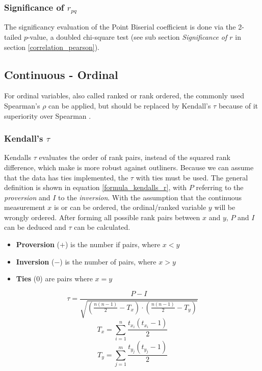 \documentclass[a4paper,headsepline,footsepline,fontsize=11pt,BCOR=12mm,DIV=12]{report}
\begin{document}
\subsubsection{Significance of $r_{pq}$}
The significancy evaluation of the Point Biserial coefficient is done via the 2-tailed $p$-value, a doubled chi-square test (see sub section \textit{Significance of $r$} in section \ref{correlation_pearson}).

\subsection{Continuous - Ordinal}
For ordinal variables, also called ranked or rank ordered, the commonly used Spearman's $\rho$ can be applied, but should be replaced by Kendall's $\tau$ because of it superiority over Spearman \cite{Newson2002}. 

\subsubsection{Kendall's $\tau$}
Kendalls $\tau$ evaluates the order of rank pairs, instead of the squared rank difference, which make is more robust against outliners. Because we can assume that the data has ties implemented, the $\tau$ with ties must be used. The general definition is shown in equation \ref{formula_kendalls_r}, with $P$ referring to the \textit{proversion} and $I$ to the \textit{inversion}. With the assumption that the continuous measurement $x$ is or can be ordered, the ordinal/ranked variable $y$ will be wrongly ordered. After forming all possible rank pairs between $x$ and $y$, $P$ and $I$ can be deduced and $\tau$ can be calculated. \cite{Reiter2015,Bossart2017}

\begin{itemize}	
	\item[] \textbf{Proversion} ($+$) is the number if pairs, where $x < y$ 
	\item[] \textbf{Inversion} ($-$) is the number of pairs, where $x > y$ 
	\item[] \textbf{Ties} ($0$) are pairs where $x = y$
\end{itemize}

\begin{equation}
\label{formula_kendalls_r}
	\tau = \frac{P-I}{\sqrt{(\frac{n(n-1)}{2}-T_x) \cdot (\frac{n(n-1)}{2}-T_y)}}
\end{equation}
\begin{equation}
\label{formula_kendalls_r}
	T_x = \sum_{i=1}^n \frac{t_{x_i}(t_{x_i}-1)}{2}
\end{equation}
\begin{equation}
\label{formula_kendalls_r}
	T_y = \sum_{j=1}^m \frac{t_{y_j}(t_{y_j}-1)}{2}
\end{equation}
\smallskip
\end{document}
